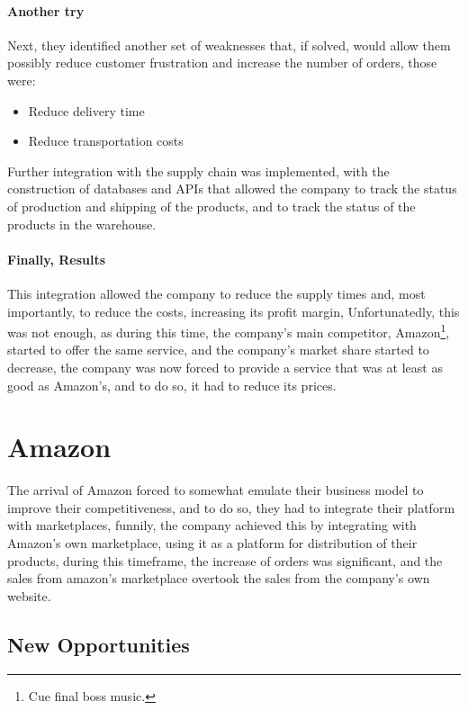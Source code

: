 \documentclass[openright, twoside, twocolumn]{report}
\begin{document}
\paragraph{Another try}

Next, they identified another set of weaknesses that, if solved, would allow them possibly reduce customer frustration and increase the number of orders, those were:

\begin{itemize}
  \item Reduce delivery time
  \item Reduce transportation costs
\end{itemize}

Further integration with the supply chain was implemented, with the construction of databases and APIs that allowed the company to track the status of production
and shipping of the products, and to track the status of the products in the warehouse.

\paragraph{Finally, Results}

This integration allowed the company to reduce the supply times and, most importantly, to reduce the costs, increasing its profit margin, Unfortunatedly, this was not enough,
as during this time, the company's main competitor, Amazon\footnote{
  Cue final boss music.
}, started to offer the same service, and the company's market share started to decrease, the company was now forced to provide a service that was
at least as good as Amazon's, and to do so, it had to reduce its prices.

\section{Amazon}
The arrival of Amazon forced to somewhat emulate their business model to improve their competitiveness, and to do so, they had to
integrate their platform with marketplaces, funnily, the company achieved this by integrating with Amazon's own marketplace, using
it as a platform for distribution of their products, during this timeframe, the increase of orders was significant, and the sales
from amazon's marketplace overtook the sales from the company's own website.

\subsection{New Opportunities}
\end{document}
